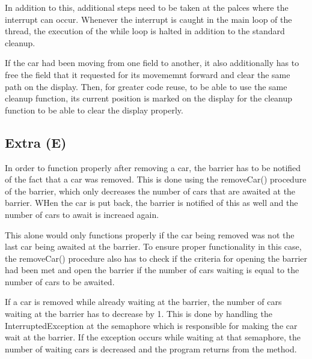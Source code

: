 In addition to this, additional steps need to be taken at the palces where the interrupt can occur. Whenever the interrupt is caught in the main loop of the thread, the execution of the while loop is halted in addition to the standard cleanup.

If the car had been moving from one field to another, it also additionally has to free the field that it requested for its movememnt forward and clear the same path on the display. Then, for greater code reuse, to be able to use the same cleanup function, its current position is marked on the display for the cleanup function to be able to clear the display properly.

\subsection{Extra (E)}

In order to function properly after removing a car, the barrier has to be notified of the fact that a car was removed. This is done using the removeCar() procedure of the barrier, which only decreases the number of cars that are awaited at the barrier. WHen the car is put back, the barrier is notified of this as well and the number of cars to await is increaed again.

This alone would only functions properly if the car being removed was not the last car being awaited at the barrier. To ensure proper functionality in this case, the removeCar() procedure also has to check if the criteria for opening the barrier had been met and open the barrier if the number of cars waiting is equal to the number of cars to be awaited. 

If a car is removed while already waiting at the barrier, the number of cars waiting at the barrier has to decrease by 1. This is done by handling the InterruptedException at the semaphore which is responsible for making the car wait at the barrier. If the exception occurs while waiting at that semaphore, the number of waiting cars is decreased and the program returns from the method.





